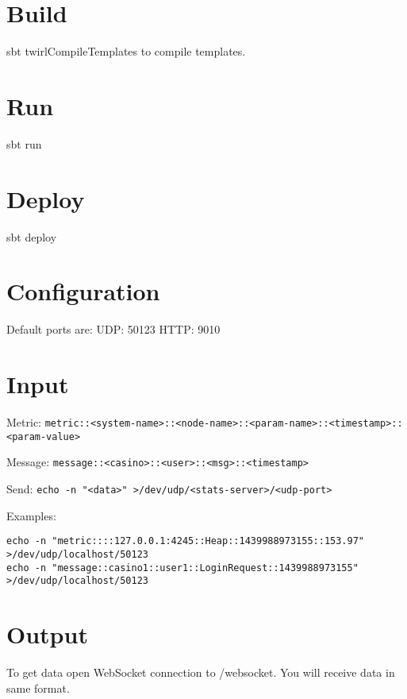 \section*{Build}

sbt twirlCompileTemplates to compile templates.

\section*{Run}

sbt run

\section*{Deploy}

sbt deploy

\section*{Configuration}

Default ports are:
UDP: 50123
HTTP: 9010

\section*{Input}

Metric:
\verb|metric::<system-name>::<node-name>::<param-name>::<timestamp>::<param-value>|

Message: 
\verb|message::<casino>::<user>::<msg>::<timestamp>|

Send: 
\verb|echo -n "<data>" >/dev/udp/<stats-server>/<udp-port>|

Examples:
\begin{lstlisting}
echo -n "metric::::127.0.0.1:4245::Heap::1439988973155::153.97" >/dev/udp/localhost/50123
echo -n "message::casino1::user1::LoginRequest::1439988973155" >/dev/udp/localhost/50123
\end{lstlisting}

\section*{Output}
To get data open WebSocket connection to /websocket. You will receive data in same format.
